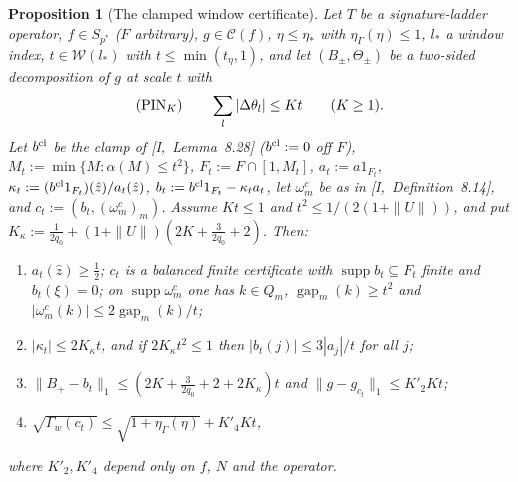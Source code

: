 \documentclass[10pt]{amsart}
\newtheorem{proposition}[theorem]{Proposition}
\theoremstyle{definition}
\theoremstyle{remark}
\newcommand{\supp}{\operatorname{supp}}
\newcommand{\Cset}{\mathcal C}
\newcommand{\gap}{\operatorname{gap}}
\newcommand{\zh}{\hat z}
\begin{document}
\begin{proposition}[The clamped window certificate]\label{prop:II-clamped}
Let $T$ be a signature-ladder operator, $f\in S_{p^*}$ \textup{(}$F$
arbitrary\textup{)}, $g\in\Cset(f)$, $\eta\le\eta_*$ with
$\eta_\Gamma(\eta)\le1$, $l_*$ a window index, $t\in\mathcal W(l_*)$ with
$t\le\min(t_\eta,1)$, and let $(B_\pm,\Theta_\pm)$ be a two-sided
decomposition of $g$ at scale $t$ with
\[
 \textup{(PIN$_K$)}\qquad\sum_l|\Delta\theta_l|\le Kt\qquad(K\ge1).
\]
Let $b^{\rm cl}$ be the clamp of [I,~Lemma~8.28] \textup{(}$b^{\rm cl}:=0$
off $F$\textup{)}, $M_t:=\min\{M:\alpha(M)\le t^2\}$, $F_t:=F\cap[1,M_t]$,
$a_t:=a1_{F_t}$, $\kappa_t:=(b^{\rm cl}1_{F_t})(\zh)/a_t(\zh)$,
$b_t:=b^{\rm cl}1_{F_t}-\kappa_ta_t$, let $\omega^c_m$ be as in
[I,~Definition~8.14], and $c_t:=(b_t,(\omega^c_m)_m)$.  Assume $Kt\le1$ and
$t^2\le1/(2(1+\|U\|))$, and put $K_\kappa:=\frac1{2q_0}+(1+\|U\|)(2K+
\frac3{2q_0}+2)$.  Then:
\begin{enumerate}
\item[(a)] $a_t(\zh)\ge\frac12$; $c_t$ is a balanced finite certificate with
$\supp b_t\subseteq F_t$ finite and $b_t(\xi)=0$; on $\supp\omega^c_m$ one
has $k\in Q_m$, $\gap_m(k)\ge t^2$ and $|\omega^c_m(k)|\le2\gap_m(k)/t$;
\item[(b)] $|\kappa_t|\le2K_\kappa t$, and if $2K_\kappa t^2\le1$ then
$|b_t(j)|\le3|a_j|/t$ for all $j$;
\item[(c)] $\|B_+-b_t\|_1\le(2K+\frac3{2q_0}+2+2K_\kappa)t$ and
$\|g-g_{c_t}\|_1\le K'_2Kt$;
\item[(d)] $\sqrt{\Gamma_w(c_t)}\le\sqrt{1+\eta_\Gamma(\eta)}+K'_4Kt$,
\end{enumerate}
where $K'_2,K'_4$ depend only on $f$, $N$ and the operator.
\end{proposition}
\end{document}
